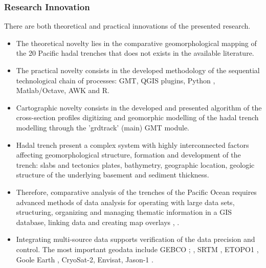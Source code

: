 \documentclass[pdflatex,compress,8pt,
	xcolor={dvipsnames,dvipsnames,svgnames,x11names,table},
	hyperref={colorlinks = true,breaklinks = true, urlcolor = NavyBlue, breaklinks = true}]{beamer}
\begin{document}
\begin{frame}\frametitle{Research Innovation}
There are both theoretical and practical innovations of the presented research. 

\begin{itemize}
            \item The theoretical novelty lies in the comparative geomorphological mapping of the 20 Pacific hadal trenches that does not exists in the available literature. 
            \item The practical novelty consists in the developed methodology of the sequential technological chain of processes: GMT, QGIS plugins, Python \cite{Rossumatal2018}, Matlab/Octave, AWK and R.
            \item Cartographic novelty consists in the developed and presented algorithm of the cross-section profiles digitizing and geomorphic modelling of the  hadal trench modelling through the 'grdtrack' (main) GMT module. 
            \item Hadal trench present a complex system with highly interconnected factors affecting geomorphological structure, formation and development of the trench: slabs and tectonics plates, bathymetry, geographic location, geologic structure of the underlying basement and sediment thickness. 
            \item Therefore, comparative analysis of the trenches of the Pacific Ocean requires advanced methods of data analysis for operating with large data sets, structuring, organizing and managing thematic information in a GIS database, linking data and creating map overlays \cite{Lemenkova201540}, \cite{Lemenkova2016e}. 
            \item Integrating multi-source data supports verification of the data precision and control. The most important geodata include GEBCO \cite{Mayeretal2018}; \cite{Monahan2004}, SRTM \cite{Beckeretal2009}, ETOPO1 \cite{AmanteEakins2009}, Goole Earth \cite{Lemenkova201510}, CryoSat-2, Envisat, Jason-1 \cite{Sandwelletal2013}.
\end{itemize}

\end{frame}
\end{document}

